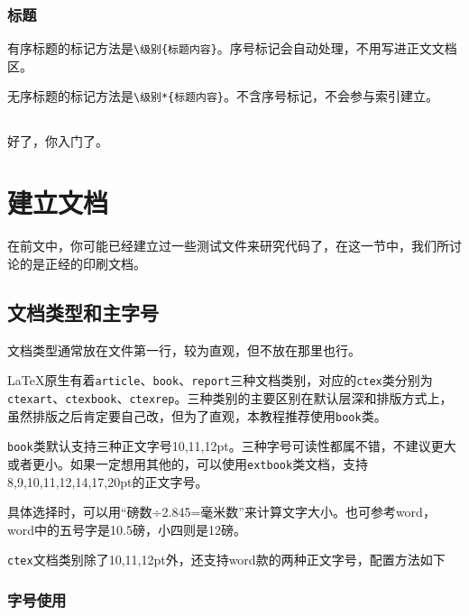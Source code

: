 \documentclass[10pt,openany]{book}
\begin{document}
\subsection{标题}

有序标题的标记方法是\texttt{\textbackslash{}级别\{标题内容\}}。序号标记会自动处理，不用写进正文文档区。

无序标题的标记方法是\texttt{\textbackslash{}级别*\{标题内容\}}。不含序号标记，不会参与索引建立。

\section*{}

好了，你入门了。

\chapter{建立文档}

在前文中，你可能已经建立过一些测试文件来研究代码了，在这一节中，我们所讨论的是正经的印刷文档。

\section{文档类型和主字号}

文档类型通常放在文件第一行，较为直观，但不放在那里也行。



\LaTeX 原生有着\texttt{article}、\texttt{book}、\texttt{report}三种文档类别，对应的\texttt{ctex}类分别为\texttt{ctexart}、\texttt{ctexbook}、\texttt{ctexrep}。三种类别的主要区别在默认层深和排版方式上，虽然排版之后肯定要自己改，但为了直观，本教程推荐使用\texttt{book}类。

\texttt{book}类默认支持三种正文字号10,11,12pt。三种字号可读性都属不错，不建议更大或者更小。如果一定想用其他的，可以使用\texttt{extbook}类文档，支持8,9,10,11,12,14,17,20pt的正文字号。

具体选择时，可以用“磅数÷2.845=毫米数”来计算文字大小。也可参考word，word中的五号字是10.5磅，小四则是12磅。

\texttt{ctex}文档类别除了10,11,12pt外，还支持word款的两种正文字号，配置方法如下



\subsection{字号使用}
\end{document}
